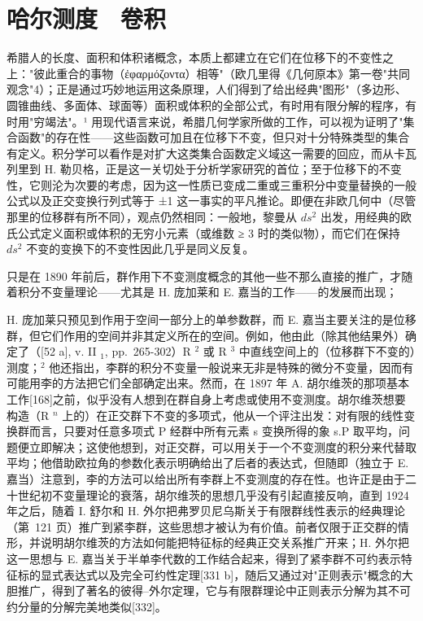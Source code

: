 \chapter{哈尔测度　卷积}

希腊人的长度、面积和体积诸概念，本质上都建立在它们在位移下的不变性之上："彼此重合的事物（ἐφαρμόζοντα）相等"（欧几里得《几何原本》第一卷"共同观念"4）；正是通过巧妙地运用这条原理，人们得到了给出经典"图形"（多边形、圆锥曲线、多面体、球面等）面积或体积的全部公式，有时用有限分解的程序，有时用"穷竭法"。¹ 用现代语言来说，希腊几何学家所做的工作，可以视为证明了"集合函数"的存在性——这些函数可加且在位移下不变，但只对十分特殊类型的集合有定义。积分学可以看作是对扩大这类集合函数定义域这一需要的回应，而从卡瓦列里到 H. 勒贝格，正是这一关切处于分析学家研究的首位；至于位移下的不变性，它则沦为次要的考虑，因为这一性质已变成二重或三重积分中变量替换的一般公式以及正交变换行列式等于 ±1 这一事实的平凡推论。即便在非欧几何中（尽管那里的位移群有所不同），观点仍然相同：一般地，黎曼从 \(ds^2\) 出发，用经典的欧氏公式定义面积或体积的无穷小元素（或维数 ≥ 3 时的类似物），而它们在保持 \(ds^2\) 不变的变换下的不变性因此几乎是同义反复。

只是在 1890 年前后，群作用下不变测度概念的其他一些不那么直接的推广，才随着积分不变量理论——尤其是 H. 庞加莱和 E. 嘉当的工作——的发展而出现；

H. 庞加莱只预见到作用于空间一部分上的单参数群，而 E. 嘉当主要关注的是位移群，但它们作用的空间并非其定义所在的空间。例如，他由此（除其他结果外）确定了（{[}52 a{]}, v. II \(_{1}\), pp.~265-302）R \(^{2}\) 或 R \(^{3}\) 中直线空间上的（位移群下不变的）测度；\(^{2}\) 他还指出，李群的积分不变量一般说来无非是特殊的微分不变量，因而有可能用李的方法把它们全部确定出来。然而，在 1897 年 A. 胡尔维茨的那项基本工作{[}168{]}之前，似乎没有人想到在群自身上考虑或使用不变测度。胡尔维茨想要构造（R \(^{n}\) 上的）在正交群下不变的多项式，他从一个评注出发：对有限的线性变换群而言，只要对任意多项式 P 经群中所有元素 s 变换所得的象 s.P 取平均，问题便立即解决；这使他想到，对正交群，可以用关于一个不变测度的积分来代替取平均；他借助欧拉角的参数化表示明确给出了后者的表达式，但随即（独立于 E. 嘉当）注意到，李的方法可以给出所有李群上不变测度的存在性。也许正是由于二十世纪初不变量理论的衰落，胡尔维茨的思想几乎没有引起直接反响，直到 1924 年之后，随着 I. 舒尔和 H. 外尔把弗罗贝尼乌斯关于有限群线性表示的经典理论（第~121 页）推广到紧李群，这些思想才被认为有价值。前者仅限于正交群的情形，并说明胡尔维茨的方法如何能把特征标的经典正交关系推广开来；H. 外尔把这一思想与 E. 嘉当关于半单李代数的工作结合起来，得到了紧李群不可约表示特征标的显式表达式以及完全可约性定理{[}331 b{]}，随后又通过对"正则表示"概念的大胆推广，得到了著名的彼得–外尔定理，它与有限群理论中正则表示分解为其不可约分量的分解完美地类似{[}332{]}。

